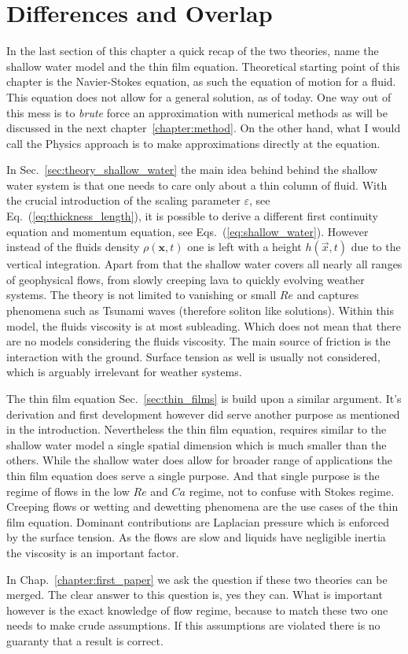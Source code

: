 \section{Differences and Overlap}
\label{sec:shallow_to_thin}

In the last section of this chapter a quick recap of the two theories, name the shallow water model and the thin film equation. 
Theoretical starting point of this chapter is the Navier-Stokes equation, as such the equation of motion for a fluid.
This equation does not allow for a general solution, as of today.
One way out of this mess is to \textit{brute} force an approximation with numerical methods as will be discussed in the next chapter~\ref{chapter:method}.
On the other hand, what I would call the Physics approach is to make approximations directly at the equation.

In Sec.~\ref{sec:theory_shallow_water} the main idea behind behind the shallow water system is that one needs to care only about a thin column of fluid.
With the crucial introduction of the scaling parameter $\varepsilon$, see Eq.~(\ref{eq:thickness_length}), it is possible to derive a different first continuity equation and momentum equation, see Eqs.~(\ref{eq:shallow_water}).
However instead of the fluids density $\rho(\mathbf{x},t)$ one is left with a height $h(\vec{x},t)$ due to the vertical integration.
Apart from that the shallow water covers all nearly all ranges of geophysical flows, from slowly creeping lava to quickly evolving weather systems.
The theory is not limited to vanishing or small $Re$ and captures phenomena such as Tsunami waves (therefore soliton like solutions). 
Within this model, the fluids viscosity is at most subleading.
Which does not mean that there are no models considering the fluids viscosity.
The main source of friction is the interaction with the ground.
Surface tension as well is usually not considered, which is arguably irrelevant for weather systems.

The thin film equation Sec.~\ref{sec:thin_films} is build upon a similar argument.
It's derivation and first development however did serve another purpose as mentioned in the introduction.
Nevertheless the thin film equation, requires similar to the shallow water model a single spatial dimension which is much smaller than the others.
While the shallow water does allow for broader range of applications the thin film equation does serve a single purpose.
And that single purpose is the regime of flows in the low $Re$ and $Ca$ regime, not to confuse with Stokes regime.
Creeping flows or wetting and dewetting phenomena are the use cases of the thin film equation.
Dominant contributions are Laplacian pressure which is enforced by the surface tension.
As the flows are slow and liquids have negligible inertia the viscosity is an important factor.

In Chap.~\ref{chapter:first_paper} we ask the question if these two theories can be merged.
The clear answer to this question is, yes they can.
What is important however is the exact knowledge of flow regime, because to match these two one needs to make crude assumptions.
If this assumptions are violated there is no guaranty that a result is correct.